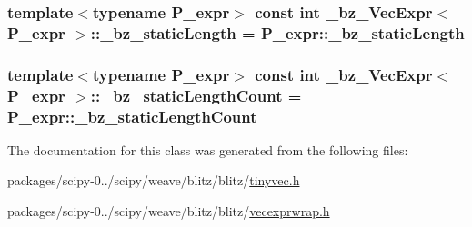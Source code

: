 \subsubsection[{\+\_\+bz\+\_\+static\+Length}]{\setlength{\rightskip}{0pt plus 5cm}template$<$typename P\+\_\+expr$>$ const int {\bf \+\_\+bz\+\_\+\+Vec\+Expr}$<$ P\+\_\+expr $>$\+::\+\_\+bz\+\_\+static\+Length = P\+\_\+expr\+::\+\_\+bz\+\_\+static\+Length\hspace{0.3cm}{\ttfamily [static]}}\label{class__bz__VecExpr_a5817f87504be43c4618189f3b31e6ec7}
\hypertarget{class__bz__VecExpr_a278f996149c247948a82d685a5b51b8b}{}
\subsubsection[{\+\_\+bz\+\_\+static\+Length\+Count}]{\setlength{\rightskip}{0pt plus 5cm}template$<$typename P\+\_\+expr$>$ const int {\bf \+\_\+bz\+\_\+\+Vec\+Expr}$<$ P\+\_\+expr $>$\+::\+\_\+bz\+\_\+static\+Length\+Count = P\+\_\+expr\+::\+\_\+bz\+\_\+static\+Length\+Count\hspace{0.3cm}{\ttfamily [static]}}\label{class__bz__VecExpr_a278f996149c247948a82d685a5b51b8b}


The documentation for this class was generated from the following files\+:\begin{DoxyCompactItemize}
\item 
packages/scipy-\/0../scipy/weave/blitz/blitz/\hyperlink{tinyvec_8h}{tinyvec.\+h}\item 
packages/scipy-\/0../scipy/weave/blitz/blitz/\hyperlink{vecexprwrap_8h}{vecexprwrap.\+h}\end{DoxyCompactItemize}
